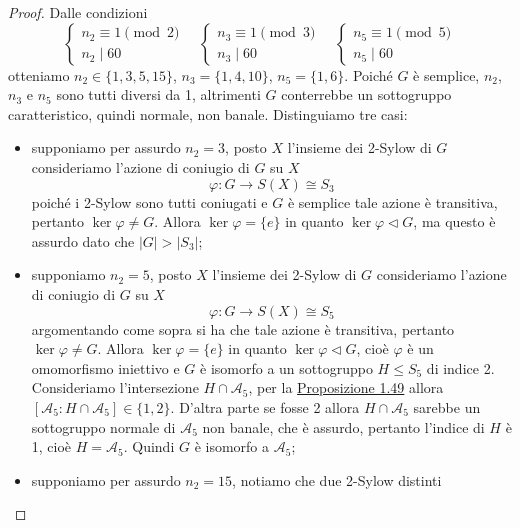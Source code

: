 \documentclass[11pt]{scrartcl}
\begin{document}
\begin{proof}
    Dalle condizioni
    \[
        \begin{cases}
            n_2 \equiv 1 \pmod 2\\
            n_2 \mid 60
        \end{cases}
        \quad
        \begin{cases}
            n_3 \equiv 1 \pmod 3\\
            n_3 \mid 60
        \end{cases}
        \quad
        \begin{cases}
            n_5 \equiv 1 \pmod 5\\
            n_5 \mid 60
        \end{cases}
    \]
    otteniamo $n_2 \in \{1, 3, 5, 15\}$, $n_3 = \{1, 4, 10\}$, $n_5 = \{1, 6\}$.
    Poiché $G$ è semplice, $n_2$, $n_3$ e $n_5$ sono tutti diversi da 1,
    altrimenti $G$ conterrebbe un sottogruppo caratteristico, quindi normale,
    non banale. Distinguiamo tre casi:
    \begin{itemize}
        \item supponiamo per assurdo $n_2 = 3$, posto $X$ l'insieme dei 2-Sylow di $G$
        consideriamo l'azione di coniugio di $G$ su $X$
        \[
            \varphi: G \longrightarrow S(X) \cong S_3
        \]
        poiché i 2-Sylow sono tutti coniugati e $G$ è semplice tale azione è 
        transitiva, pertanto $\ker\varphi \neq G$. Allora $\ker\varphi = \{e\}$ 
        in quanto $\ker\varphi\triangleleft G$,
        ma questo è assurdo dato che $|G| > |S_3|$;
        \item supponiamo $n_2 = 5$, posto $X$ l'insieme dei 2-Sylow di $G$
        consideriamo l'azione di coniugio di $G$ su $X$
        \[
            \varphi: G \longrightarrow S(X) \cong S_5
        \]
        argomentando come sopra si ha che tale azione è transitiva, pertanto
        $\ker\varphi \neq G$. Allora $\ker\varphi = \{e\}$ in quanto 
        $\ker\varphi \triangleleft G$, cioè $\varphi$ è un omomorfismo iniettivo
        e $G$ è isomorfo a un sottogruppo $H\leqslant S_5$ di indice 2. Consideriamo
        l'intersezione $H \cap \mathcal{A}_5$, per la \hyperref[prop2.0]{Proposizione 1.49}
        allora $[\mathcal{A}_5:H\cap\mathcal{A}_5] \in \{1, 2\}$. D'altra parte
        se fosse 2 allora $H\cap\mathcal{A}_5$ sarebbe un sottogruppo normale di $\mathcal{A}_5$
        non banale, che è assurdo, pertanto l'indice di $H$ è 1, cioè $H = \mathcal{A}_5$.
        Quindi $G$ è isomorfo a $\mathcal{A}_5$;
        \item supponiamo per assurdo $n_2 = 15$, notiamo che due 2-Sylow distinti

\end{itemize}
\end{proof}
\end{document}

